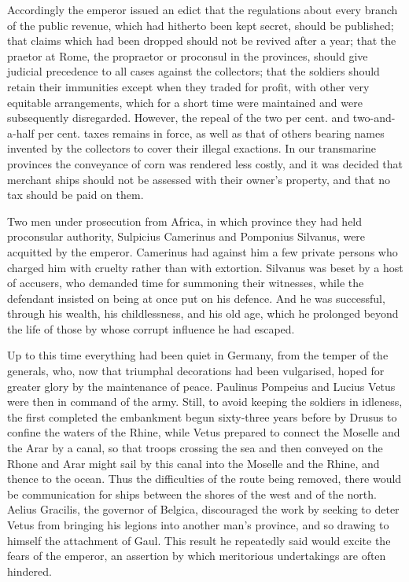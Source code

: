 
Accordingly the emperor issued an edict that the regulations about every branch of the public revenue, which had hitherto been kept secret, should be published; that claims which had been dropped should not be revived after a year; that the praetor at Rome, the propraetor or proconsul in the provinces, should give judicial precedence to all cases against the collectors; that the soldiers should retain their immunities except when they traded for profit, with other very equitable arrangements, which for a short time were maintained and were subsequently disregarded. However, the repeal of the two per cent. and two-and-a-half per cent. taxes remains in force, as well as that of others bearing names invented by the collectors to cover their illegal exactions. In our transmarine provinces the conveyance of corn was rendered less costly, and it was decided that merchant ships should not be assessed with their owner's property, and that no tax should be paid on them.


Two men under prosecution from Africa, in which province they had held proconsular authority, Sulpicius Camerinus and Pomponius Silvanus, were acquitted by the emperor. Camerinus had against him a few private persons who charged him with cruelty rather than with extortion. Silvanus was beset by a host of accusers, who demanded time for summoning their witnesses, while the defendant insisted on being at once put on his defence. And he was successful, through his wealth, his childlessness, and his old age, which he prolonged beyond the life of those by whose corrupt influence he had escaped.


Up to this time everything had been quiet in Germany, from the temper of the generals, who, now that triumphal decorations had been vulgarised, hoped for greater glory by the maintenance of peace. Paulinus Pompeius and Lucius Vetus were then in command of the army. Still, to avoid keeping the soldiers in idleness, the first completed the embankment begun sixty-three years before by Drusus to confine the waters of the Rhine, while Vetus prepared to connect the Moselle and the Arar by a canal, so that troops crossing the sea and then conveyed on the Rhone and Arar might sail by this canal into the Moselle and the Rhine, and thence to the ocean. Thus the difficulties of the route being removed, there would be communication for ships between the shores of the west and of the north. Aelius Gracilis, the governor of Belgica, discouraged the work by seeking to deter Vetus from bringing his legions into another man's province, and so drawing to himself the attachment of Gaul. This result he repeatedly said would excite the fears of the emperor, an assertion by which meritorious undertakings are often hindered.

